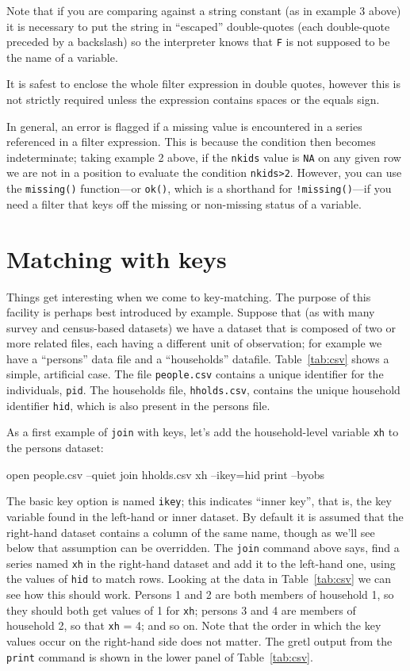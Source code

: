 Note that if you are comparing against a string constant (as in
example 3 above) it is necessary to put the string in ``escaped''
double-quotes (each double-quote preceded by a backslash) so the
interpreter knows that \texttt{F} is not supposed to be the name of a
variable.

It is safest to enclose the whole filter expression in double quotes,
however this is not strictly required unless the expression contains
spaces or the equals sign.

In general, an error is flagged if a missing value is encountered in
a series referenced in a filter expression. This is because the
condition then becomes indeterminate; taking example 2 above, if the
\texttt{nkids} value is \texttt{NA} on any given row we are not in a
position to evaluate the condition \texttt{nkids>2}. However, you can
use the \texttt{missing()} function---or \texttt{ok()}, which is a
shorthand for \texttt{!missing()}---if you need a filter that keys off
the missing or non-missing status of a variable.


\section{Matching with keys}
\label{sec:join-keys}

Things get interesting when we come to key-matching. The purpose of
this facility is perhaps best introduced by example.  Suppose that (as
with many survey and census-based datasets) we have a dataset that is
composed of two or more related files, each having a different unit of
observation; for example we have a ``persons'' data file and a
``households'' datafile. Table~\ref{tab:csv} shows a simple,
artificial case. The file \texttt{people.csv} contains a unique
identifier for the individuals, \texttt{pid}. The households file,
\texttt{hholds.csv}, contains the unique household identifier
\texttt{hid}, which is also present in the persons file.

As a first example of \texttt{join} with keys, let's add the
household-level variable \texttt{xh} to the persons dataset:
%
\begin{code}
open people.csv --quiet
join hholds.csv xh --ikey=hid
print --byobs
\end{code}

The basic key option is named \texttt{ikey}; this indicates ``inner
key'', that is, the key variable found in the left-hand or inner
dataset. By default it is assumed that the right-hand dataset contains
a column of the same name, though as we'll see below that assumption
can be overridden. The \texttt{join} command above says, find a series
named \texttt{xh} in the right-hand dataset and add it to the
left-hand one, using the values of \texttt{hid} to match rows.
Looking at the data in Table~\ref{tab:csv} we can see how this should
work. Persons 1 and 2 are both members of household 1, so they should
both get values of 1 for \texttt{xh}; persons 3 and 4 are members of
household 2, so that \texttt{xh} = 4; and so on. Note that the order
in which the key values occur on the right-hand side does not matter.
The gretl output from the \texttt{print} command is shown in the lower
panel of Table~\ref{tab:csv}.

